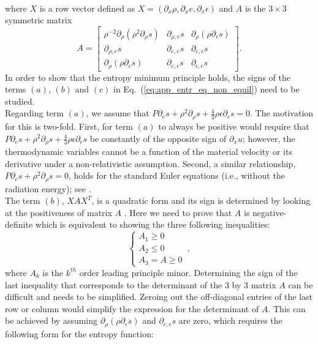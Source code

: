 \documentclass[review]{elsarticle}
\newcommand{\eqt}[1]{Eq.~(\ref{#1})}                     %
\begin{document}
\begin{appendices}
\begin{multline}
 \end{multline} 
 where $X$ is a row vector defined as $X=\left( \partial_x \rho, \partial_x e, \partial_x \epsilon \right)$ and $A$ is the $3 \times 3$ symmetric matrix
 \begin{equation}
 A = 
 \left[
 \begin{array}{ccc}
\rho^{-2}\partial_{\rho} \left( \rho^2 \partial_{\rho} s \right) & \partial_{\rho,e} s & \partial_{\rho} \left( \rho \partial_{\epsilon} s \right) \\
 \partial_{\rho,e} s & \partial_{e,e} s & \partial_{e,\epsilon} s \\
 \partial_{\rho} \left( \rho \partial_{\epsilon} s \right) & \partial_{e,\epsilon} s & \partial_{\epsilon,\epsilon} s
 \end{array}
 \right] .
 \end{equation}
 In order to show that the entropy minimum principle holds, the signs of the terms $(a)$, $(b)$ and $(c)$ in \eqt{eq:app_entr_eq_non_equil} need to be studied.\\
Regarding term $(a)$, we assume that $P \partial_e s + \rho^2 \partial_{\rho} s + \frac{4}{3} \rho \epsilon \partial_{\epsilon} s=0$. The motivation for this is two-fold. First, for term $(a)$ to always be positive would require that $P \partial_e s + \rho^2 \partial_{\rho} s + \frac{4}{3} \rho \epsilon \partial_{\epsilon} s$ be constantly of the opposite sign of $\partial_x u$; however, the thermodynamic variables cannot be a function of the material velocity or its derivative under a non-relativistic assumption. 
Second, a similar relationship, $P \partial_e s + \rho^2 \partial_{\rho} s = 0$, holds for the standard Euler equations (i.e., without the radiation energy); see \cite{jlg}. \\
The term $(b)$, $XAX^T$, is a quadratic form and its sign is determined by looking at the positiveness of matrix $A$ \cite{Evans}. Here we need to prove that $A$ is negative-definite which is equivalent to showing the three following inequalities:
\begin{equation}
 \left\{
 \begin{array}{ccc}
 A_1 \geq 0 \\
 A_2 \leq 0 \\
 A_3 = A \geq 0
 \end{array}
 \right. \,,
 \end{equation}
 where $A_k$ is the $k^{th}$ order leading principle minor. Determining the sign of the last inequality that corresponds to the determinant of the $3$ by $3$ matrix $A$ can be difficult and needs to be simplified. Zeroing out the off-diagonal entries of the last row or column would simplify the expression for the determinant of $A$. This can be achieved by assuming $\partial_{\rho}(\rho \partial_{\epsilon} s)$ and $\partial_{e, \epsilon} s$ are zero, which requires the following form for the entropy function:

\end{appendices}
\end{document}
